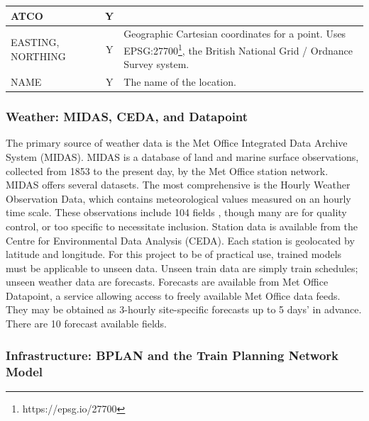 \documentclass[12pt,a4paper]{article}
\begin{document}
\begin{table}[h!]
\begin{tabular}{|p{2.5cm}|c|c|p{8.5cm}|}
ATCO               &                                      & Y                                    &                                                                                                                                                                                     \\ \hline
EASTING, NORTHING  &                                      & Y                                    & Geographic Cartesian coordinates for a point. Uses EPSG:27700\footnote{https://epsg.io/27700}, the British National Grid / Ordnance Survey system.                                                                  \\ \hline
NAME               &                                      & Y                                    & The name of the location.                                                                                                                                                           \\ \hline
\end{tabular}
\end{table}

\subsubsection{Weather: MIDAS, CEDA, and Datapoint}

The primary source of weather data is the Met Office Integrated Data Archive System (MIDAS). MIDAS is a database of land and marine surface observations, collected from 1853 to the present day, by the Met Office station network. MIDAS offers several datasets. The most comprehensive is the Hourly Weather Observation Data, which contains meteorological values measured on an hourly time scale. These observations include 104 fields , though many are for quality control, or too specific to necessitate inclusion. Station data is available from the Centre for Environmental Data Analysis (CEDA). Each station is geolocated by latitude and longitude. For this project to be of practical use, trained models must be applicable to unseen data. Unseen train data are simply train schedules; unseen weather data are forecasts. Forecasts are available from Met Office Datapoint, a service allowing access to freely available Met Office data feeds. They may be obtained as 3-hourly site-specific forecasts up to 5 days’ in advance. There are 10 forecast available fields. 

\subsubsection{Infrastructure: BPLAN and the Train Planning Network Model}
\end{document}
